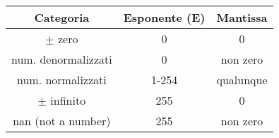 \documentclass{standalone}
\providecommand\lightrule{%
	\arrayrulecolor{black!30}%
	\midrule[\lightrulewidth]%
	\arrayrulecolor{black}}
\begin{document}
\begin{tabular}{ ccc }
	\toprule
		Categoria & Esponente (E) & Mantissa\\
	\midrule
		\(\pm\) zero & 0 & 0 \\\lightrule
		num. denormalizzati & 0 & non zero\\\lightrule
		num. normalizzati & 1-254 & qualunque\\\lightrule
		\(\pm\) infinito & 255 & 0\\\lightrule
		nan (not a number) & 255 & non zero\\
	\bottomrule
\end{tabular}
\end{document}
